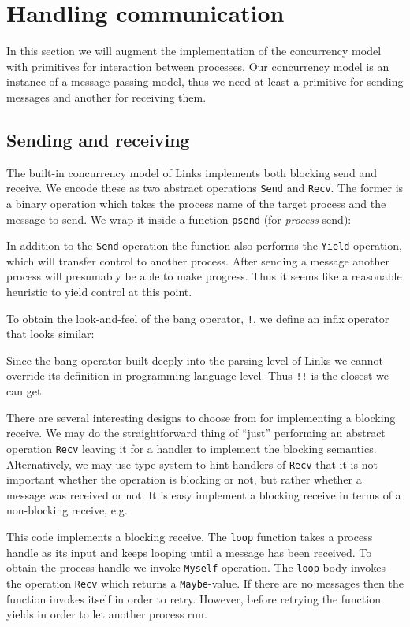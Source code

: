 \documentclass[12pt,mscres,cdtppar,twoside,openright,logo,rightchapter,normalheadings]{infthesis}
\newcommand{\snippet}[1]{}
\theoremstyle{definition}
\begin{document}
\section{Handling communication}
\label{sec:links-model-handlers-communication}

In this section we will augment the implementation of the concurrency
model with primitives for interaction between processes. Our
concurrency model is an instance of a message-passing model, thus we
need at least a primitive for sending messages and another for
receiving them.

\subsection{Sending and receiving}

The built-in concurrency model of Links implements both blocking send
and receive. We encode these as two abstract operations
\lstinline$Send$ and \lstinline$Recv$. The former is a binary
operation which takes the process name of the target process and the
message to send. We wrap it inside a function \lstinline$psend$ (for
\emph{process} send):
%
\snippet{psend.links}
%
In addition to the \lstinline$Send$ operation the function also
performs the \lstinline$Yield$ operation, which will transfer control
to another process. After sending a message another process will
presumably be able to make progress. Thus it seems like a reasonable
heuristic to yield control at this point.  

To obtain the look-and-feel of the bang operator, \lstinline$!$, we
define an infix operator that looks similar:
%
\snippet{psendOp.links}
%
Since the bang operator built deeply into the parsing level of Links
we cannot override its definition in programming language level. Thus
\lstinline$!!$ is the closest we can get.

There are several interesting designs to choose from for implementing
a blocking receive. We may do the straightforward thing of ``just''
performing an abstract operation \lstinline$Recv$ leaving it for a
handler to implement the blocking semantics. Alternatively, we may use
type system to hint handlers of \lstinline$Recv$ that it is not
important whether the operation is blocking or not, but rather whether
a message was received or not. It is easy implement a blocking receive
in terms of a non-blocking receive, e.g.
%
\snippet{precv.links}
%
This code implements a blocking receive.  The \lstinline$loop$
function takes a process handle as its input and keeps looping until a
message has been received. To obtain the process handle we invoke
\lstinline$Myself$ operation. The \lstinline$loop$-body invokes the
operation \lstinline$Recv$ which returns a \lstinline$Maybe$-value. If
there are no messages then the function invokes itself in order to
retry. However, before retrying the function yields in order to let
another process run.
\end{document}

